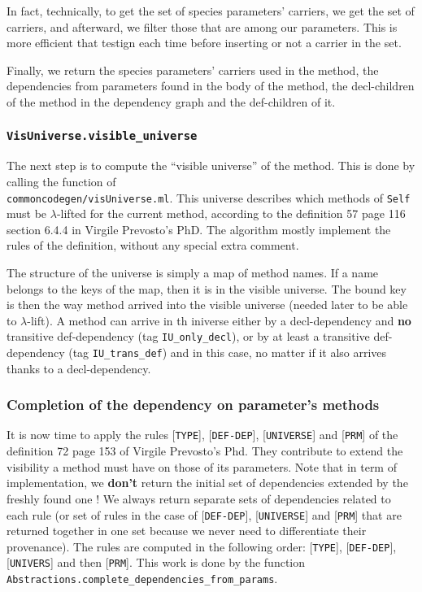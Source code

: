 \medskip
In fact, technically, to get the set of species parameters' carriers,
we get the set of carriers, and afterward, we filter those that are
among our parameters. This is more efficient that testign each time
before inserting or not a carrier in the set.

\medskip
Finally, we return the species parameters' carriers used in the
method, the dependencies from parameters found in the body of the
method, the decl-children of the method in the dependency graph and
the def-children of it.


\subsubsection{{\tt VisUniverse.visible\_universe}}
The next step is to compute the ``visible universe'' of the
method. This is done by calling the function of \\
{\tt commoncodegen/visUniverse.ml}. This universe describes which
methods of {\tt Self} must be $\lambda$-lifted for the current method,
according to the definition 57 page 116 section 6.4.4 in Virgile
Prevosto's PhD. The algorithm mostly implement the rules of the
definition, without any special extra comment.

The structure of the universe is simply a map of method names. If a
name belongs to the keys of the map, then it is in the visible
universe. The bound key is then the way method arrived into the
visible universe (needed later to be able to $\lambda$-lift). A method
can arrive in th iniverse either by a decl-dependency and {\bf no}
transitive def-dependency (tag {\tt IU\_only\_decl}), or by at least a
transitive def-dependency (tag {\tt IU\_trans\_def}) and in this case,
no matter if it also arrives thanks to a decl-dependency.


\subsubsection{Completion of the dependency on parameter's methods}
It is now time to apply the rules [{\tt TYPE}], [{\tt DEF-DEP}],
[{\tt UNIVERSE}] and [{\tt PRM}] of the definition 72 page 153 of
Virgile Prevosto's Phd. They contribute to extend the visibility a
method must have on those of its parameters. Note that in term of
implementation, we {\bf don't} return the initial set of dependencies
extended by the freshly found one ! We always return separate sets of
dependencies related to each rule (or set of rules in the case of
[{\tt DEF-DEP}], [{\tt UNIVERSE}] and [{\tt PRM}] that are returned
together in one set because we never need to differentiate their
provenance). The rules are computed in the following order:
[{\tt TYPE}], [{\tt DEF-DEP}], [{\tt UNIVERS}] and then [{\tt PRM}].
This work is done by the function
{\tt Abstractions.complete\_dependencies\_from\_params}.


